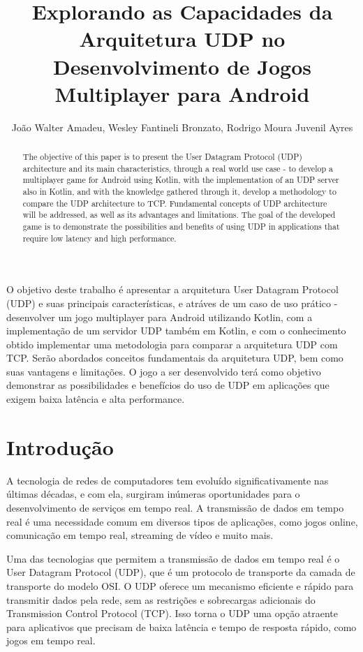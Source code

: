 \documentclass[12pt]{article}
\title{Explorando as Capacidades da Arquitetura UDP no\\ Desenvolvimento de Jogos Multiplayer para Android}
\author{João Walter Amadeu\inst{1}, Wesley Fantineli Bronzato\inst{1}, Rodrigo Moura Juvenil Ayres\inst{1} }
\begin{document}
 

\maketitle

\begin{abstract}
  The objective of this paper is to present the User Datagram Protocol (UDP) architecture and its main characteristics, through a real world use case - to develop a multiplayer game for Android using Kotlin, with the implementation of an UDP server also in Kotlin, and with the knowledge gathered through it, develop a methodology to compare the UDP architecture to TCP. Fundamental concepts of UDP architecture will be addressed, as well as its advantages and limitations. The goal of the developed game is to demonstrate the possibilities and benefits of using UDP in applications that require low latency and high performance.
\end{abstract}
     
\begin{resumo} 
  
O objetivo deste trabalho é apresentar a arquitetura User
Datagram Protocol (UDP) e suas principais características, e atráves de um caso de uso prático - desenvolver um jogo multiplayer para Android utilizando Kotlin, com a implementação de um servidor UDP também em Kotlin, e com o conhecimento obtido implementar uma metodologia para comparar a arquitetura UDP com TCP. Serão abordados conceitos fundamentais da arquitetura UDP, bem como suas vantagens e limitações. O jogo a ser desenvolvido terá como objetivo demonstrar as possibilidades e benefícios do uso de UDP em aplicações que exigem baixa latência e alta performance.
\end{resumo}


\section{Introdução}
A tecnologia de redes de computadores tem evoluído significativamente nas últimas décadas, e com ela, surgiram inúmeras oportunidades para o desenvolvimento de serviços em tempo real. A transmissão de dados em tempo real é uma necessidade comum em diversos tipos de aplicações, como jogos online, comunicação em tempo real, streaming de vídeo e muito mais.

Uma das tecnologias que permitem a transmissão de dados em tempo real é o User Datagram Protocol (UDP), que é um protocolo de transporte da camada de transporte do modelo OSI. O UDP oferece um mecanismo eficiente e rápido para transmitir dados pela rede, sem as restrições e sobrecargas adicionais do Transmission Control Protocol (TCP). Isso torna o UDP uma opção atraente para aplicativos que precisam de baixa latência e tempo de resposta rápido, como jogos em tempo real.
\end{document}
